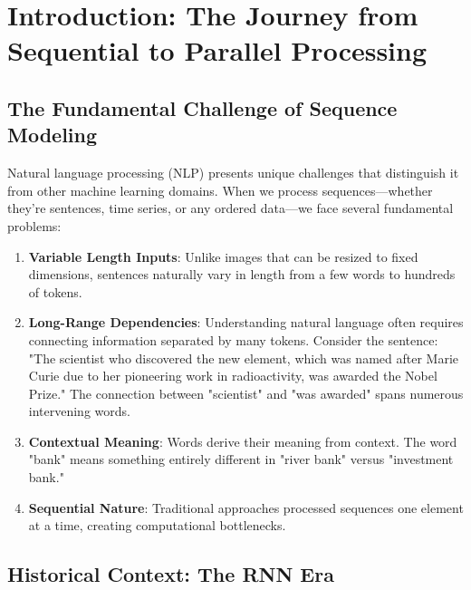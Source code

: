 
\section{Introduction: The Journey from Sequential to Parallel Processing}

\subsection{The Fundamental Challenge of Sequence Modeling}

Natural language processing (NLP) presents unique challenges that distinguish it from other machine learning domains. When we process sequences—whether they're sentences, time series, or any ordered data—we face several fundamental problems:

\begin{enumerate}
    \item \textbf{Variable Length Inputs}: Unlike images that can be resized to fixed dimensions, sentences naturally vary in length from a few words to hundreds of tokens.

    \item \textbf{Long-Range Dependencies}: Understanding natural language often requires connecting information separated by many tokens. Consider the sentence: "The scientist who discovered the new element, which was named after Marie Curie due to her pioneering work in radioactivity, was awarded the Nobel Prize." The connection between "scientist" and "was awarded" spans numerous intervening words.

    \item \textbf{Contextual Meaning}: Words derive their meaning from context. The word "bank" means something entirely different in "river bank" versus "investment bank."

    \item \textbf{Sequential Nature}: Traditional approaches processed sequences one element at a time, creating computational bottlenecks.
\end{enumerate}

\subsection{Historical Context: The RNN Era}

